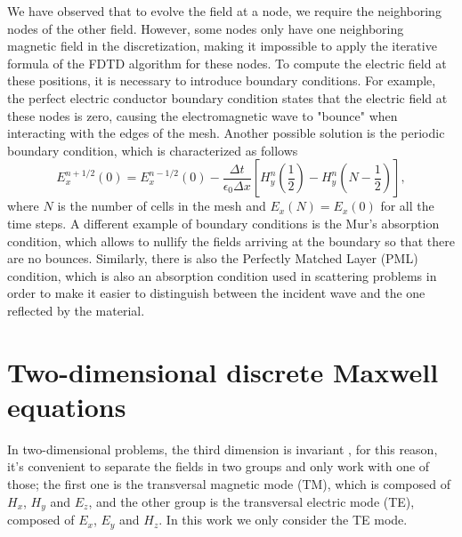 \documentclass[12pt, oneside]{book}
\begin{document}
We have observed that to evolve the field at a node, we require the neighboring nodes of the other field. However, some nodes only have one neighboring magnetic field in the discretization, making it impossible to apply the iterative formula of the FDTD algorithm for these nodes. To compute the electric field at these positions, it is necessary to introduce boundary conditions. For example, the perfect electric conductor boundary condition states that the electric field at these nodes is zero, causing the electromagnetic wave to "bounce" when interacting with the edges of the mesh. Another possible solution is the periodic boundary condition, which is characterized as follows
\begin{equation}
    E_x^{n+1/2}(0) = E_x^{n-1/2}(0) - \dfrac{\Delta t}{\epsilon_0 \Delta x}\left[H_{y}^{n}\left(\frac{1}{2}\right)-H_{y}^{n}\left(N-\frac{1}{2}\right)\right],
\end{equation} 
where $N$ is the number of cells in the mesh and $E_x(N) = E_x(0)$ for all the time steps. A different example of boundary conditions is the Mur's absorption condition, which allows to nullify the fields arriving at the boundary so that there are no bounces. Similarly, there is also the Perfectly Matched Layer (PML) condition, which is also an absorption condition used in scattering problems in order to make it easier to distinguish between the incident wave and the one reflected by the material.


\section{Two-dimensional discrete Maxwell equations}

In two-dimensional problems, the third dimension is invariant \cite{peterson1992electromagnetic}, for this reason, it's convenient to separate the fields in two groups and only work with one of those; the first one is the transversal magnetic mode (TM), which is composed of $H_x$, $H_y$ and $E_z$, and the other group is the transversal electric mode (TE), composed of $E_x$, $E_y$ and $H_z$. In this work we only consider the TE mode.
\end{document}
